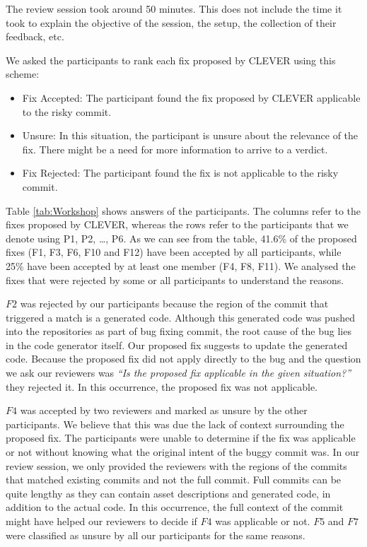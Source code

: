 \documentclass[sigconf]{acmart}
\providecommand{\tightlist}{%
  \setlength{\itemsep}{0pt}\setlength{\parskip}{0pt}}
\begin{document}
The review session took around 50 minutes. This does not include the
time it took to explain the objective of the session, the setup, the
collection of their feedback, etc.

We asked the participants to rank each fix proposed by CLEVER using this
scheme:

\begin{itemize}
\tightlist
\item
  Fix Accepted: The participant found the fix proposed by CLEVER
  applicable to the risky commit.
\item
  Unsure: In this situation, the participant is unsure about the
  relevance of the fix. There might be a need for more information to
  arrive to a verdict.
\item
  Fix Rejected: The participant found the fix is not applicable to the
  risky commit.
\end{itemize}

Table \ref{tab:Workshop} shows answers of the participants. The columns
refer to the fixes proposed by CLEVER, whereas the rows refer to the
participants that we denote using P1, P2, \ldots{}, P6. As we can see
from the table, 41.6\% of the proposed fixes (F1, F3, F6, F10 and F12)
have been accepted by all participants, while 25\% have been accepted by
at least one member (F4, F8, F11). We analysed the fixes that were
rejected by some or all participants to understand the reasons.

\(F2\) was rejected by our participants because the region of the commit
that triggered a match is a generated code. Although this generated code
was pushed into the repositories as part of bug fixing commit, the root
cause of the bug lies in the code generator itself. Our proposed fix
suggests to update the generated code. Because the proposed fix did not
apply directly to the bug and the question we ask our reviewers was
\emph{``Is the proposed fix applicable in the given situation?''} they
rejected it. In this occurrence, the proposed fix was not applicable.

\(F4\) was accepted by two reviewers and marked as unsure by the other
participants. We believe that this was due the lack of context
surrounding the proposed fix. The participants were unable to determine
if the fix was applicable or not without knowing what the original
intent of the buggy commit was. In our review session, we only provided
the reviewers with the regions of the commits that matched existing
commits and not the full commit. Full commits can be quite lengthy as
they can contain asset descriptions and generated code, in addition to
the actual code. In this occurrence, the full context of the commit
might have helped our reviewers to decide if \(F4\) was applicable or
not. \(F5\) and \(F7\) were classified as unsure by all our participants
for the same reasons.
\end{document}
